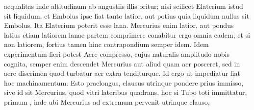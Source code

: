                    aequalitas inde altitudinum  ab angustiis illis oritur; nisi scilicet Elaterium\protect{} istud  sit  liquidum, et Embolus\protect{} ipse fiat tanto latior, aut potius quia  liquidum nullus sit Embolus\protect{}. Ita Elaterium\protect{}  poterit esse lana. Mercurius\protect{} enim latior, aut pondus\protect{} latius etiam latiorem lanae  partem comprimere conabitur ergo omnia eadem; et si non  latiorem, fortius tamen hinc contrapondium semper idem. Idem  experimentum fieri potest Aere compresso, cujus naturalis  amplitudo nobis cognita, semper enim descendet Mercurius\protect{} aut aliud  quam aer posceret, sed in aere discrimen  quod turbatur aer extra tenditurque. Id ergo ut impediatur  fiat hoc machinamentum. Esto  praelongus,  clausus utrinque pondere\protect{} prius immisso, sive id sit Mercurius\protect{},  quod  vitri lateribus quadrans, hoc si  Tubo toti immittatur, primum , inde  ubi Mercurius\protect{} ad extremum pervenit utrinque clauso,
